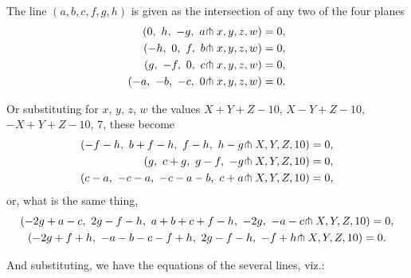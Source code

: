 \documentclass[11pt,a4paper]{article}
\begin{document}
\newpage
\setcounter{page}{327}

The line $(a, b, c, f, g, h)$ is given as the intersection of any two of the four planes
\begin{align*}
(0,\ h,\ -g,\ a\hspace{-0.2em}\pitchfork x, y, z, w) &= 0,\\
(-h,\ 0,\ f,\ b\hspace{-0.2em}\pitchfork x, y, z, w) &= 0,\\
(g,\ -f,\ 0,\ c\hspace{-0.2em}\pitchfork x, y, z, w) &= 0,\\
(-a,\ -b,\ -c,\ 0\hspace{-0.2em}\pitchfork x, y, z, w) &= 0.
\end{align*}

Or substituting for $x$, $y$, $z$, $w$ the values $X+Y+Z-10$, $X-Y+Z-10$, $-X+Y+Z-10$, 7, these become
\begin{align*}
(-f-h,\ b+f-h,\ f-h,\ h-g\hspace{-0.2em}\pitchfork X, Y, Z, 10) &= 0,\\
(g,\ c+g,\ g-f,\ -g\hspace{-0.2em}\pitchfork X, Y, Z, 10) &= 0,\\
(c-a,\ -c-a,\ -c-a-b,\ c+a\hspace{-0.2em}\pitchfork X, Y, Z, 10) &= 0,
\end{align*}
or, what is the same thing,
\begin{multline*}
(-2g+a-c,\ 2g-f-h,\ a+b+c+f-h,\ -2g,\ -a-c\hspace{-0.2em}\pitchfork X, Y, Z, 10) = 0,\\
(-2g+f+h,\ -a-b-c-f+h,\ 2g-f-h,\ -f+h\hspace{-0.2em}\pitchfork X, Y, Z, 10) = 0.
\end{multline*}

And substituting, we have the equations of the several lines, viz.:
\end{document}
